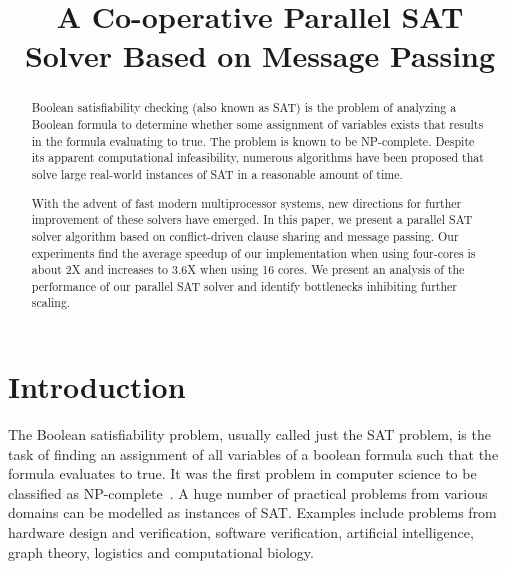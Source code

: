 \documentclass[letterpaper, compsoc, conference]{IEEEtran}
\begin{document}
\title{A Co-operative Parallel SAT Solver Based on Message Passing}

\author{
    \and {}
}
\maketitle
\pagestyle{plain}
\setcounter{page}{1}

\begin{abstract} Boolean satisfiability checking (also known as SAT) is the
problem of analyzing a Boolean formula to determine whether some assignment of
variables exists that results in the formula evaluating to true. The problem is
known to be NP-complete. Despite its apparent computational infeasibility,
numerous algorithms have been proposed that solve large real-world instances of
SAT in a reasonable amount of time. 

With the advent of fast modern multiprocessor systems, new directions for
further improvement of these solvers have emerged. In this paper, we present a
parallel SAT solver algorithm based on conflict-driven clause sharing and
message passing. Our experiments find the average speedup of our implementation
when using four-cores is about 2X and increases to 3.6X when using 16 cores.
We present an analysis of the performance of our parallel SAT solver and
identify bottlenecks inhibiting further scaling.
\end{abstract}

\section{Introduction}
The Boolean satisfiability problem, usually called just the SAT problem, is the
task of finding an assignment of all variables of a boolean formula such that
the formula evaluates to true. It was the first problem in computer science to
be classified as NP-complete~\cite{Cook1971}. A huge number of practical
problems from various domains can be modelled as instances of SAT.  Examples
include problems from hardware design and verification, software verification,
artificial intelligence, graph theory, logistics and computational biology. 
\end{document}
